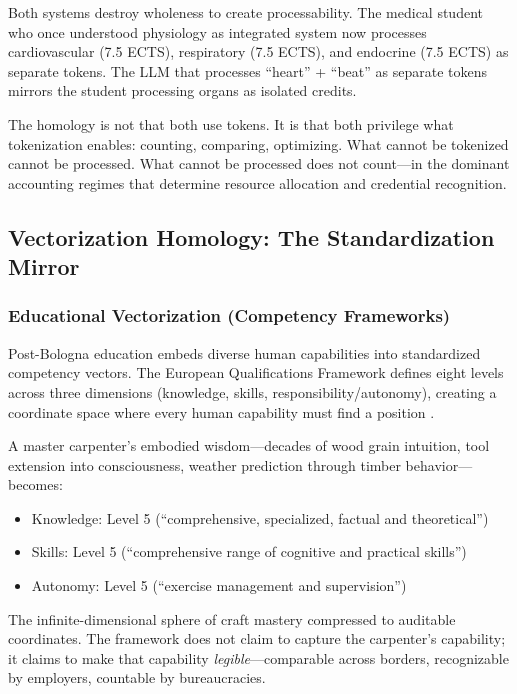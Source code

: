 Both systems destroy wholeness to create processability. The medical student who once understood physiology as integrated system now processes cardiovascular (7.5 ECTS), respiratory (7.5 ECTS), and endocrine (7.5 ECTS) as separate tokens. The LLM that processes ``heart'' + ``beat'' as separate tokens mirrors the student processing organs as isolated credits.

The homology is not that both use tokens. It is that both privilege what tokenization enables: counting, comparing, optimizing. What cannot be tokenized cannot be processed. What cannot be processed does not count---in the dominant accounting regimes that determine resource allocation and credential recognition.

\subsection{Vectorization Homology: The Standardization Mirror}

\subsubsection{Educational Vectorization (Competency Frameworks)}

Post-Bologna education embeds diverse human capabilities into standardized competency vectors. The European Qualifications Framework defines eight levels across three dimensions (knowledge, skills, responsibility/autonomy), creating a coordinate space where every human capability must find a position \citep{eqf2017}.

A master carpenter's embodied wisdom---decades of wood grain intuition, tool extension into consciousness, weather prediction through timber behavior---becomes:
\begin{itemize}
\item Knowledge: Level 5 (``comprehensive, specialized, factual and theoretical'')
\item Skills: Level 5 (``comprehensive range of cognitive and practical skills'')
\item Autonomy: Level 5 (``exercise management and supervision'')
\end{itemize}

The infinite-dimensional sphere of craft mastery compressed to auditable coordinates. The framework does not claim to capture the carpenter's capability; it claims to make that capability \textit{legible}---comparable across borders, recognizable by employers, countable by bureaucracies.

